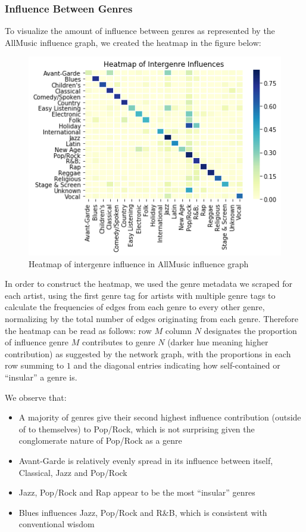 \subsubsection{Influence Between Genres}
To visualize the amount of influence between genres as represented by the AllMusic influence graph, we created the heatmap in the figure below:

\begin{figure}[H]
\includegraphics[width=\textwidth]{figures/heatmap.png}
\caption{Heatmap of intergenre influence in AllMusic influence graph}
\end{figure}

In order to construct the heatmap, we used the genre metadata we scraped for each artist, using the first genre tag for artists with multiple genre tags to calculate the frequencies of edges from each genre to every other genre, normalizing by the total number of edges originating from each genre. Therefore the heatmap can be read as follows: row $M$ column $N$ designates the proportion of influence genre $M$ contributes to genre $N$ (darker hue meaning higher contribution) as suggested by the network graph, with the proportions in each row summing to $1$ and the diagonal entries indicating how self-contained or ``insular'' a genre is.

We observe that:
\begin{itemize}
    \item A majority of genres give their second highest influence contribution (outside of to themselves) to Pop/Rock, which is not surprising given the conglomerate nature of Pop/Rock as a genre
    \item Avant-Garde is relatively evenly spread in its influence between itself, Classical, Jazz and Pop/Rock
    \item Jazz, Pop/Rock and Rap appear to be the most ``insular'' genres
    \item Blues influences Jazz, Pop/Rock and R\&B, which is consistent with conventional wisdom
\end{itemize}

